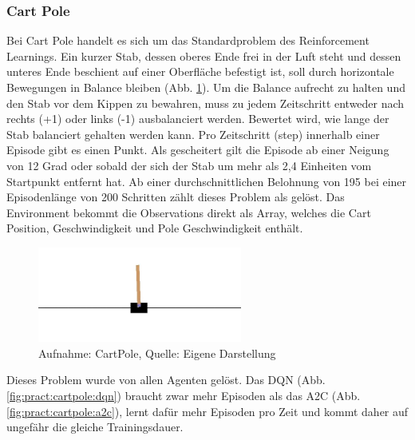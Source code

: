 \documentclass[12pt,a4paper]{article}
\begin{document}
\subsubsection{Cart Pole}
Bei Cart Pole handelt es sich um das Standardproblem des Reinforcement Learnings.
Ein kurzer Stab, dessen oberes Ende frei in der Luft steht und dessen unteres Ende beschient auf einer Oberfläche befestigt ist, soll durch horizontale Bewegungen in Balance bleiben (Abb. \ref{fig:pract:cartpole}).
Um die Balance aufrecht zu halten und den Stab vor dem Kippen zu bewahren, muss zu jedem Zeitschritt entweder nach rechts (+1) oder links (-1) ausbalanciert werden. 
Bewertet wird, wie lange der Stab balanciert gehalten werden kann.
Pro Zeitschritt (step) innerhalb einer Episode gibt es einen Punkt.
Als gescheitert gilt die Episode ab einer Neigung von 12 Grad oder sobald der sich der Stab um mehr als 2,4 Einheiten vom Startpunkt entfernt hat.
Ab einer durchschnittlichen Belohnung von 195 bei einer Episodenlänge von 200 Schritten zählt dieses Problem als gelöst.
Das Environment bekommt die Observations direkt als Array, welches die Cart Position, Geschwindigkeit und Pole Geschwindigkeit enthält.

\begin{figure}[!h]
	\centering
	\includegraphics[width=0.6\textwidth]{gfx/cartpole}
	\caption{Aufnahme: CartPole, Quelle: Eigene Darstellung}
	\label{fig:pract:cartpole}
\end{figure}

Dieses Problem wurde von allen Agenten gelöst.
Das DQN (Abb. \ref{fig:pract:cartpole:dqn}) braucht zwar mehr Episoden als das A2C (Abb. \ref{fig:pract:cartpole:a2c}), lernt dafür mehr Episoden pro Zeit und kommt daher auf ungefähr die gleiche Trainingsdauer.
\end{document}
